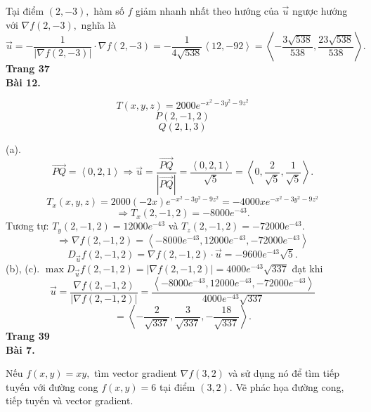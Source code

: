 \documentclass[12pt,a4paper]{article}
\begin{document}
Tại điểm \(\left( {2, - 3} \right),\) hàm số \(f\) giảm nhanh nhất theo hướng của \(\overrightarrow u \) ngược hướng với \(\nabla f\left( {2, - 3} \right),\) nghĩa là
\[\overrightarrow u  =  - \frac{1}{{\left| {\nabla f\left( {2, - 3} \right)} \right|}} \cdot \nabla f\left( {2, - 3} \right) =  - \frac{1}{{4\sqrt {538} }}\left\langle {12, - 92} \right\rangle  = \left\langle { - \frac{{3\sqrt {538} }}{{538}},\frac{{23\sqrt {538} }}{{538}}} \right\rangle .\]
\textbf{Trang 37}\\
\textbf{Bài 12.}
\begin{mybox}
\[T\left( {x,y,z} \right) = 2000{e^{ - {x^2} - 3{y^2} - 9{z^2}}}\]
\[P\left( {2, - 1,2} \right)\]
\[Q\left( {2,1,3} \right)\]
\end{mybox}
(a). \[\overrightarrow {PQ}  = \left\langle {0,2,1} \right\rangle  \Rightarrow \overrightarrow u  = \frac{{\overrightarrow {PQ} }}{{\left| {\overrightarrow {PQ} } \right|}} = \frac{{\left\langle {0,2,1} \right\rangle }}{{\sqrt 5 }} = \left\langle {0,\frac{2}{{\sqrt 5 }},\frac{1}{{\sqrt 5 }}} \right\rangle .\]
\[{T_x}\left( {x,y,z} \right) = 2000\left( { - 2x} \right){e^{ - {x^2} - 3{y^2} - 9{z^2}}} =  - 4000x{e^{ - {x^2} - 3{y^2} - 9{z^2}}}\]
\[ \Rightarrow {T_x}\left( {2, - 1,2} \right) =  - 8000{e^{ - 43}}.\]
Tương tự: \({T_y}\left( {2, - 1,2} \right) = 12000{e^{ - 43}}\) và \({T_z}\left( {2, - 1,2} \right) =  - 72000{e^{ - 43}}.\)\\
\[ \Rightarrow \nabla f\left( {2, - 1,2} \right) = \left\langle { - 8000{e^{ - 43}},12000{e^{ - 43}}, - 72000{e^{ - 43}}} \right\rangle \]
\[{D_{\overrightarrow u }}f\left( {2, - 1,2} \right) = \nabla f\left( {2, - 1,2} \right) \cdot \overrightarrow u  =  - 9600{e^{ - 43}}\sqrt 5 .\]
(b), (c). \(\max {D_{\overrightarrow u }}f\left( {2, - 1,2} \right) = \left| {\nabla f\left( {2, - 1,2} \right)} \right| = 4000{e^{ - 43}}\sqrt {337} \) đạt khi 
\[\overrightarrow u  = \frac{{\nabla f\left( {2, - 1,2} \right)}}{{\left| {\nabla f\left( {2, - 1,2} \right)} \right|}} = \frac{{\left\langle { - 8000{e^{ - 43}},12000{e^{ - 43}}, - 72000{e^{ - 43}}} \right\rangle }}{{4000{e^{ - 43}}\sqrt {337} }}\]
\[ = \left\langle { - \frac{2}{{\sqrt {337} }},\frac{3}{{\sqrt {337} }}, - \frac{{18}}{{\sqrt {337} }}} \right\rangle .\]
\textbf{Trang 39}\\
\textbf{Bài 7.}
\begin{mybox}
Nếu \(f\left( {x,y} \right) = xy,\) tìm vector gradient \(\nabla f\left( {3,2} \right)\) và sử dụng nó để tìm tiếp tuyến với đường cong \(f\left( {x,y} \right) = 6\) tại điểm \(\left( {3,2} \right).\) Vẽ phác họa đường cong, tiếp tuyến và vector gradient.
\end{mybox}
\end{document}
